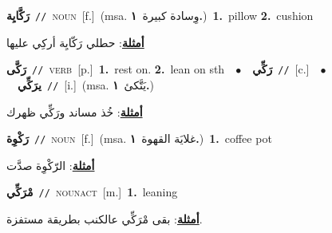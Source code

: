 \documentclass[10pt,a4paper,twoside]{article} %
\begin{document}
\begin{multicols}{2}
{\setlength\topsep{0pt}\textbf{\foreignlanguage{arabic}{رَكَّايِة}}\ {\color{gray}\texttt{//}\color{black}}\ \textsc{noun}\ [f.]\ \color{gray}(msa. \foreignlanguage{arabic}{وِسادة كبيرة}~\foreignlanguage{arabic}{\textbf{١.}})\color{black}\ \textbf{1.}~pillow  \textbf{2.}~cushion\  \begin{flushright}\color{gray}\foreignlanguage{arabic}{\textbf{\underline{\foreignlanguage{arabic}{أمثلة}}}: حطلي رَكّايِة أركِي عليها}\end{flushright}\color{black}} \vspace{2mm}

{\setlength\topsep{0pt}\textbf{\foreignlanguage{arabic}{رَكَّى}}\ {\color{gray}\texttt{//}\color{black}}\ \textsc{verb}\ [p.]\ \textbf{1.}~rest on.  \textbf{2.}~lean on sth\ \ $\bullet$\ \ \setlength\topsep{0pt}\textbf{\foreignlanguage{arabic}{رَكِّي}}\ {\color{gray}\texttt{//}\color{black}}\ [c.]\ \ $\bullet$\ \ \setlength\topsep{0pt}\textbf{\foreignlanguage{arabic}{يرَكِّي}}\ {\color{gray}\texttt{//}\color{black}}\ [i.]\ \color{gray}(msa. \foreignlanguage{arabic}{يَتَّكئ}~\foreignlanguage{arabic}{\textbf{١.}})\color{black}\  \begin{flushright}\color{gray}\foreignlanguage{arabic}{\textbf{\underline{\foreignlanguage{arabic}{أمثلة}}}: خُذ مساند ورَكِّي ظهرك}\end{flushright}\color{black}} \vspace{2mm}

{\setlength\topsep{0pt}\textbf{\foreignlanguage{arabic}{رَكْوِة}}\ {\color{gray}\texttt{//}\color{black}}\ \textsc{noun}\ [f.]\ \color{gray}(msa. \foreignlanguage{arabic}{غلايَة القهوة}~\foreignlanguage{arabic}{\textbf{١.}})\color{black}\ \textbf{1.}~coffee pot\  \begin{flushright}\color{gray}\foreignlanguage{arabic}{\textbf{\underline{\foreignlanguage{arabic}{أمثلة}}}: الرّكْوِة صدَّت}\end{flushright}\color{black}} \vspace{2mm}

{\setlength\topsep{0pt}\textbf{\foreignlanguage{arabic}{مْرَكِّي}}\ {\color{gray}\texttt{//}\color{black}}\ \textsc{noun\textunderscore act}\ [m.]\ \textbf{1.}~leaning\  \begin{flushright}\color{gray}\foreignlanguage{arabic}{\textbf{\underline{\foreignlanguage{arabic}{أمثلة}}}: بقى مْرَكِّي عالكنب بطريقة مستفزة.}\end{flushright}\color{black}} \vspace{2mm}


\end{multicols}
\end{document}
